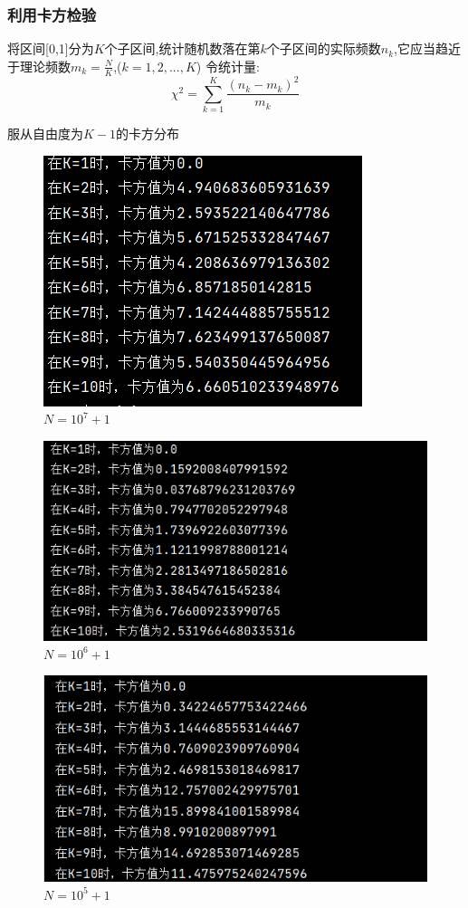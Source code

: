\documentclass[UTF8]{ctexart}
\begin{document}
\subsubsection{利用卡方检验}
将区间[0,1]分为$K$个子区间,统计随机数落在第$k $个子区间的实际频数$n_k$,它应当趋近于理论频数$m_k=\frac{N}{K}$,($k=1,2,...,K$)
令统计量:
\begin{equation}
    \chi ^2=\sum_{k = 1}^{K}  \frac{(n_k-m_k)^2}{m_k}
\end{equation}

服从自由度为$K-1$的卡方分布
\begin{figure}[H]
    \centering
    \includegraphics[scale=0.5]{10^7卡方.png}
    \caption{$N=10^7+1$}
\end{figure}
\begin{figure}[H]
    \centering
    \includegraphics[scale=0.5]{10^6卡方.png}
    \caption{$N=10^6+1$}
\end{figure}
\begin{figure}[H]
    \centering
    \includegraphics[scale=0.5]{10^5卡方.png}
    \caption{$N=10^5+1$}
\end{figure}
\end{document}
